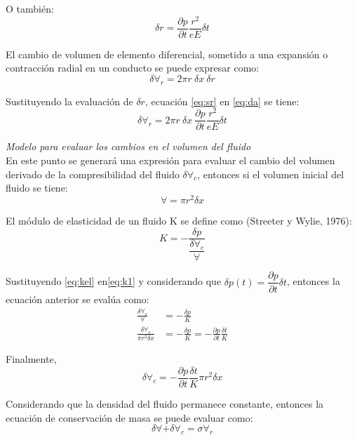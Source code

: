 \documentclass[letterpaper]{report}
\begin{document}
O también:
\begin{equation}
	\delta r=\frac{\partial p}{\partial t}\frac{r^2}{eE}\delta t
\label{eq:sr}
\end{equation}

El cambio de volumen de elemento diferencial, sometido a una expansión o contracción radial en un conducto se puede expresar como:
\begin{equation}
	\delta\forall_r=2\pi r\ \delta x\ \delta r
	\label{eq:da}
\end{equation}

Sustituyendo la evaluación de $\delta r$, ecuación \ref{eq:sr} en \ref{eq:da} se tiene:
\begin{equation}
	\delta\forall_r=2\pi r\ \delta x\ \frac{\partial p}{\partial t}\frac{r^2}{eE}\delta t
	\label{eq:dar}
\end{equation}

\emph{Modelo para evaluar los cambios en el volumen del fluido}\\
En este punto se generará una expresión para evaluar el cambio del volumen derivado de la compresibilidad del fluido $\delta\forall_c$, entonces si el volumen inicial del fluido se tiene:
\begin{equation}
	\forall=\pi r^2\delta x
	\label{eq:kel}
\end{equation}

El módulo de elasticidad de un fluido K se define como (Streeter y Wylie, 1976):
\begin{equation}
	K=-\frac{\delta p}{\dfrac{\delta\forall_c}{\forall}}
	\label{eq:k1}
\end{equation}

Sustituyendo \ref{eq:kel} en\ref{eq:k1} y considerando que $\delta p(t)=\dfrac{\partial p}{\partial t}\delta t$, entonces la ecuación anterior se evalúa como:
\begin{align*}
	\frac{\delta\forall_c}{\forall} &=-\frac{\delta p}{K}\\
	\frac{\delta\forall_c}{\pi r^2\delta x} &=-\frac{\delta p}{K}=-\frac{\partial p}{\partial t}\frac{\delta t}{K}
\end{align*}

Finalmente,
\begin{equation}
	\delta\forall_c=-\frac{\partial p}{\partial t}\frac{\delta t}{K}\pi r^2\delta x
	\label{eq:dda}
\end{equation}

Considerando que la densidad del fluido permanece constante, entonces la ecuación de conservación de masa se puede evaluar como:
\begin{equation}
	\delta\forall+\delta\forall_c=\sigma\forall_r
	\label{eq:daa}
\end{equation}
\end{document}
